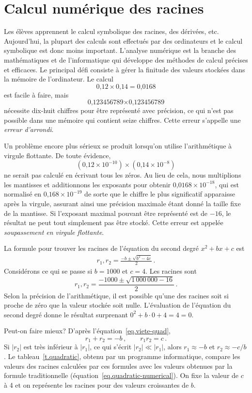 \section{Calcul numérique des racines}\label{s.numerical}


Les élèves apprennent le calcul symbolique des racines, des dérivées, etc. Aujourd'hui, la plupart des calculs sont effectués par des ordinateurs et le calcul symbolique est donc moins important. L'analyse numérique est la branche des mathématiques et de l'informatique qui développe des méthodes de calcul précises et efficaces. Le principal défi consiste à gérer la finitude des valeurs stockées dans la mémoire de l'ordinateur. Le calcul 
\[\mbox{0,12}\times \mbox{0,14}=\mbox{0,0168}\]
est facile à faire, mais 
\[
\mbox{0,123456789}\times \mbox{0,123456789}\]
nécessite dix-huit chiffres pour être représenté avec précision, ce qui n'est pas possible dans une mémoire qui contient seize chiffres. Cette erreur s'appelle une \emph{erreur d'arrondi}.

Un problème encore plus sérieux se produit  lorsqu'on utilise l'arithmétique à virgule flottante. De toute évidence,
\[(\mbox{0,12}\times 10^{-10})\times (\mbox{0,14}\times 10^{-8})\]
ne serait pas calculé en écrivant tous les zéros. Au lieu de cela, nous multiplions les mantisses et additionnons les exposants pour obtenir $\mbox{0,0168}\times 10^{-18}$, qui est normalisé en $\mbox{0,168}\times 10^{-19}$ de sorte que le chiffre le plus significatif apparaisse après la virgule, assurant ainsi une précision maximale étant donné la taille fixe de la mantisse. Si l'exposant maximal pouvant être représenté est de $-16$, le résultat ne peut tout simplement pas être stocké. Cette erreur est appelée \emph{soupassement en virgule flottante}.



La formule pour trouver les racines de l'équation du second degré $x^2+bx+c$ est 
\begin{align}
r_1, r_2 = \frac{-b\pm\sqrt{b^2-4c}}{2}\,.\label{eq.quadratic-numerical}
\end{align}
Considérons ce qui se passe si $b=1000$ et $c=4$. Les racines sont 
\[
r_1, r_2 = \frac{-1000\pm\sqrt{1\,000\,000-16}}{2}\,.
\]
Selon la précision de l'arithmétique, il est possible qu'une des racines soit si proche de zéro que la valeur stockée soit nulle. L'évaluation de l'équation du second degré donne le résultat surprenant $0^2+b\cdot 0 +4= 4= 0$.

Peut-on faire mieux? D'après l'équation~\ref{eq.viete-quad},
\[
r_1+r_2 = -b\,,\quad\quad r_1r_2=c\,.
\]
Si $|r_2|$ est très inférieur à $|r_1|$, ce qui s'écrit $|r_2|\ll |r_1|$, alors $r_1\approx -b$ et $r_2\approx -c/b$. Le tableau~\ref{t.quadratic}, obtenu par un programme informatique, compare les valeurs des racines calculées par ces formules avec les valeurs obtenues par la formule traditionnelle (équation~\ref{eq.quadratic-numerical}). On fixe la valeur de $c$  à 4 et on représente les racines pour des valeurs croissantes de $b$.

